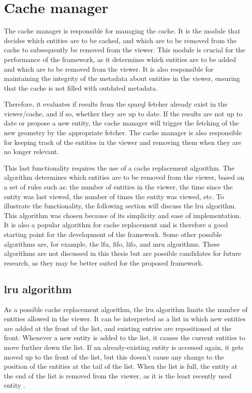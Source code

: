 \section{Cache manager}
The cache manager is responsible for managing the cache. It is the module that decides which entities are to be cached, and which are to be removed from the cache to subsequently be removed from the viewer. This module is crucial for the performance of the framework, as it determines which entities are to be added and which are to be removed from the viewer. It is also responsible for maintaining the integrity of the metadata about entities in the viewer, ensuring that the cache is not filled with outdated metadata.

Therefore, it evaluates if results from the \ac{sparql} fetcher already exist in the viewer/cache, and if so, whether they are up to date. If the results are not up to date or propose a new entity, the cache manager will trigger the fetching of the new geometry by the appropriate fetcher. The cache manager is also responsible for keeping track of the entities in the viewer and removing them when they are no longer relevant.

This last functionality requires the use of a cache replacement algorithm. The algorithm determines which entities are to be removed from the viewer, based on a set of rules such as: the number of entities in the viewer, the time since the entity was last viewed, the number of times the entity was viewed, etc. To illustrate the functionality, the following section will discuss the \ac{lru} algorithm. This algorithm was chosen because of its simplicity and ease of implementation. It is also a popular algorithm for cache replacement and is therefore a good starting point for the development of the framework. Some other possible algorithms are, for example, the \ac{lfu}, \ac{fifo}, \ac{lifo}, and \ac{mru} algorithms\parencite{cacheAlgorigthms}. These algorithms are not discussed in this thesis but are possible candidates for future research, as they may be better suited for the proposed framework.

\subsection{\acs{lru} algorithm}
As a possible cache replacement algorithm, the \ac{lru} algorithm limits the number of entities allowed in the viewer. It can be interpreted as a list in which new entities are added at the front of the list, and existing entries are repositioned at the front. Whenever a new entity is added to the list, it causes the current entities to move further down the list. If an already-existing entity is accessed again, it gets moved up to the front of the list, but this doesn't cause any change to the position of the entities at the tail of the list. When the list is full, the entity at the end of the list is removed from the viewer, as it is the least recently used entity \parencite{cacheAlgorigthms}.

